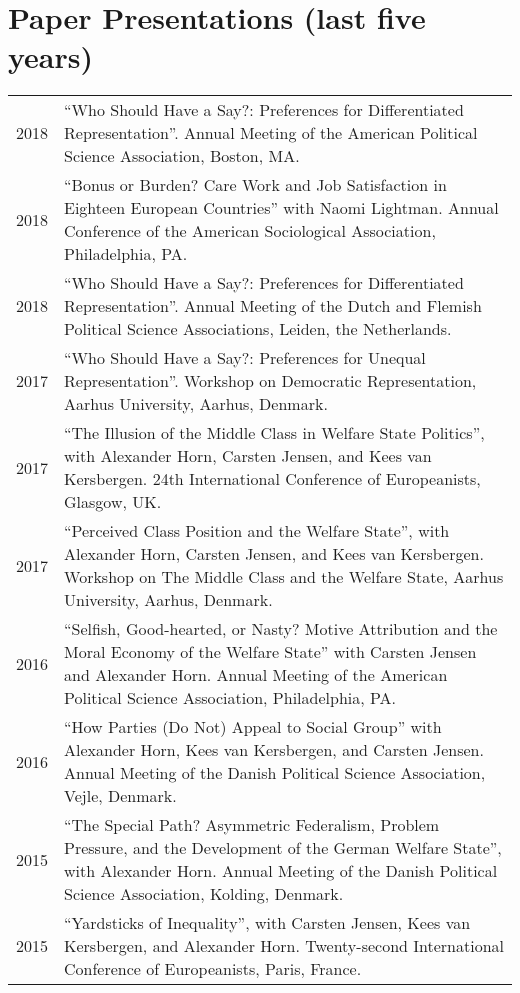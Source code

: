 \documentclass[letterpaper,fontsize=10pt]{scrartcl}
\begin{document}
	\section{Paper Presentations (last five years)}
	\vspace{-1.5em}
	\begin{tabularx}{\textwidth}{@{} l X @{} }
    2018 & ``Who Should Have a Say?: Preferences for Differentiated Representation''. Annual Meeting of the American Political Science Association, Boston, MA.\\[1ex]
    2018 & ``Bonus or Burden? Care Work and Job Satisfaction in Eighteen European Countries'' with Naomi Lightman. Annual Conference of the American Sociological Association, Philadelphia, PA.\\[1ex]
    2018 & ``Who Should Have a Say?: Preferences for Differentiated Representation''. Annual Meeting of the Dutch and Flemish Political Science Associations, Leiden, the Netherlands.\\[1ex]
		2017 & ``Who Should Have a Say?: Preferences for Unequal Representation''. Workshop on Democratic Representation, Aarhus University, Aarhus, Denmark.\\[1ex]
		2017 & ``The Illusion of the Middle Class in Welfare State Politics'', with Alexander Horn, Carsten Jensen, and Kees van Kersbergen. 24th International Conference of Europeanists, Glasgow, UK.\\[1ex]
		2017 & ``Perceived Class Position and the Welfare State'', with Alexander Horn, Carsten Jensen, and Kees van Kersbergen. Workshop on The Middle Class and the Welfare State, Aarhus University, Aarhus, Denmark.\\[1ex]
		2016 & ``Selfish, Good-hearted, or Nasty? Motive Attribution and the Moral Economy of the Welfare State'' with Carsten Jensen and Alexander Horn. Annual Meeting of the American Political Science Association, Philadelphia, PA.\\[1ex]
		2016 & ``How Parties (Do Not) Appeal to Social Group'' with Alexander Horn, Kees van Kersbergen, and Carsten Jensen. Annual Meeting of the Danish Political Science Association, Vejle, Denmark.\\[1ex]
		2015 & ``The Special Path? Asymmetric Federalism, Problem Pressure, and the Development of the German Welfare State'', with Alexander Horn. Annual Meeting of the Danish Political Science Association, Kolding, Denmark.\\[1ex]
		2015 & ``Yardsticks of Inequality'', with Carsten Jensen, Kees van Kersbergen, and Alexander Horn. Twenty-second International Conference of Europeanists, Paris, France.\\[1ex]

\end{tabularx}
\end{document}
